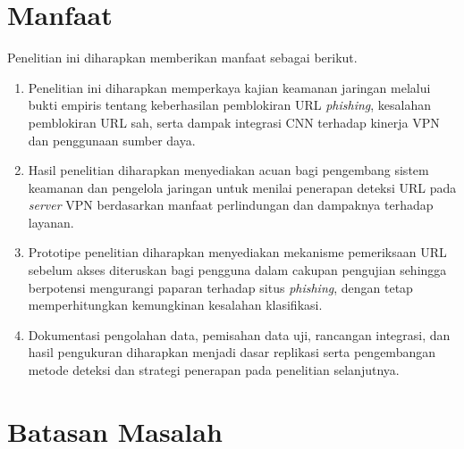 \section{Manfaat}

Penelitian ini diharapkan memberikan manfaat sebagai berikut.
\begin{enumerate}[leftmargin=*, itemsep=0.35em]
  \item Penelitian ini diharapkan memperkaya kajian keamanan jaringan melalui bukti empiris tentang keberhasilan pemblokiran URL \textit{phishing}, kesalahan pemblokiran URL sah, serta dampak integrasi CNN terhadap kinerja VPN dan penggunaan sumber daya.
  \item Hasil penelitian diharapkan menyediakan acuan bagi pengembang sistem keamanan dan pengelola jaringan untuk menilai penerapan deteksi URL pada \textit{server} VPN berdasarkan manfaat perlindungan dan dampaknya terhadap layanan.
  \item Prototipe penelitian diharapkan menyediakan mekanisme pemeriksaan URL sebelum akses diteruskan bagi pengguna dalam cakupan pengujian sehingga berpotensi mengurangi paparan terhadap situs \textit{phishing}, dengan tetap memperhitungkan kemungkinan kesalahan klasifikasi.
  \item Dokumentasi pengolahan data, pemisahan data uji, rancangan integrasi, dan hasil pengukuran diharapkan menjadi dasar replikasi serta pengembangan metode deteksi dan strategi penerapan pada penelitian selanjutnya.
\end{enumerate}

\section{Batasan Masalah}

